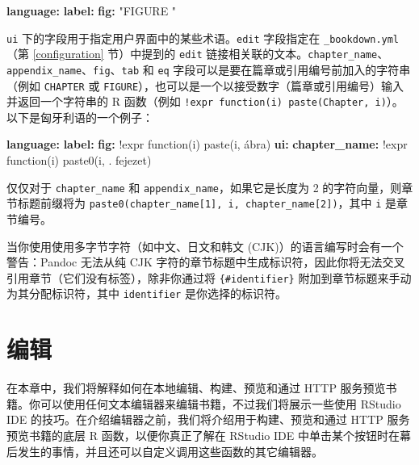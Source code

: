 \documentclass[
  12pt,
]{krantz}
\newenvironment{Shaded}{\begin{snugshade}}{\end{snugshade}}
\newcommand{\AttributeTok}[1]{\textcolor[rgb]{0.13,0.29,0.53}{#1}}
\newcommand{\FunctionTok}[1]{\textcolor[rgb]{0.13,0.29,0.53}{\textbf{#1}}}
\newcommand{\KeywordTok}[1]{\textcolor[rgb]{0.13,0.29,0.53}{\textbf{#1}}}
\newcommand{\StringTok}[1]{\textcolor[rgb]{0.31,0.60,0.02}{#1}}
\theoremstyle{definition}
\theoremstyle{definition}
\theoremstyle{definition}
\theoremstyle{definition}
\theoremstyle{remark}
\begin{document}
\begin{Shaded}
\begin{Highlighting}[]
\FunctionTok{language}\KeywordTok{:}
\AttributeTok{  }\FunctionTok{label}\KeywordTok{:}
\AttributeTok{    }\FunctionTok{fig}\KeywordTok{:}\AttributeTok{ }\StringTok{"FIGURE "}
\end{Highlighting}
\end{Shaded}

\texttt{ui} 下的字段用于指定用户界面中的某些术语。\texttt{edit} 字段指定在 \texttt{\_bookdown.yml}（第 \ref{configuration} 节）中提到的 \texttt{edit} 链接相关联的文本。\texttt{chapter\_name}、\texttt{appendix\_name}、\texttt{fig}、\texttt{tab} 和 \texttt{eq} 字段可以是要在篇章或引用编号前加入的字符串（例如 \texttt{CHAPTER} 或 \texttt{FIGURE}），也可以是一个以接受数字（篇章或引用编号）输入并返回一个字符串的 R 函数（例如 \texttt{!expr\ function(i)\ paste(\textquotesingle{}Chapter\textquotesingle{},\ i)}）。以下是匈牙利语的一个例子：

\begin{Shaded}
\begin{Highlighting}[]
\FunctionTok{language}\KeywordTok{:}
\AttributeTok{  }\FunctionTok{label}\KeywordTok{:}
\AttributeTok{    }\FunctionTok{fig}\KeywordTok{:}\AttributeTok{ !expr function(i) paste(i, \textquotesingle{}ábra\textquotesingle{})}
\AttributeTok{  }\FunctionTok{ui}\KeywordTok{:}
\AttributeTok{    }\FunctionTok{chapter\_name}\KeywordTok{:}\AttributeTok{ !expr function(i) paste0(i, \textquotesingle{}. fejezet\textquotesingle{})}
\end{Highlighting}
\end{Shaded}

仅仅对于 \texttt{chapter\_name} 和 \texttt{appendix\_name}，如果它是长度为 2 的字符向量，则章节标题前缀将为 \texttt{paste0(chapter\_name{[}1{]},\ i,\ chapter\_name{[}2{]})}，其中 \texttt{i} 是章节编号。

当你使用使用多字节字符（如中文、日文和韩文 (CJK)）的语言编写时会有一个警告：Pandoc 无法从纯 CJK 字符的章节标题中生成标识符，因此你将无法交叉引用章节（它们没有标签），除非你通过将 \texttt{\{\#identifier\}} 附加到章节标题来手动为其分配标识符，其中 \texttt{identifier} 是你选择的标识符。

\hypertarget{editing}{%
\chapter{编辑}\label{editing}}

在本章中，我们将解释如何在本地编辑、构建、预览和通过 HTTP 服务预览书籍。你可以使用任何文本编辑器来编辑书籍，不过我们将展示一些使用 RStudio IDE 的技巧。在介绍编辑器之前，我们将介绍用于构建、预览和通过 HTTP 服务预览书籍的底层 R 函数，以便你真正了解在 RStudio IDE 中单击某个按钮时在幕后发生的事情，并且还可以自定义调用这些函数的其它编辑器。
\end{document}

